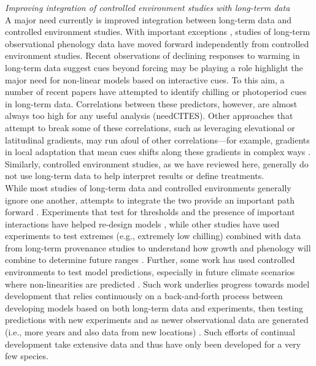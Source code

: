 \documentclass[11pt,letter]{article}
\begin{document}
\emph{Improving integration of controlled environment studies with long-term data}\\
A major need currently is improved integration between long-term data and controlled environment studies. With important exceptions \citep{gauzere2017}, studies of long-term observational phenology data have moved forward independently from controlled environment studies. Recent observations of declining responses to warming in long-term data suggest cues beyond forcing may be playing a role \citep{fu2015} highlight the major need for non-linear models based on interactive cues. To this aim, a number of recent papers have attempted to identify chilling or photoperiod cues in long-term data. Correlations between these predictors, however, are almost always too high for any useful analysis (needCITES). Other approaches that attempt to break some of these correlations, such as leveraging elevational or latitudinal gradients, may run afoul of other correlations---for example, gradients in local adaptation that mean cues shifts along these gradients in complex ways \citep{tansey2017}. Similarly, controlled environment studies, as we have reviewed here, generally do not use long-term data to help interpret results or define treatments. \\

While most studies of long-term data and controlled environments generally ignore one another, attempts to integrate the two provide an important path forward \citep{Caffarra:2011qf,nagano2012,satake2013,ford2016,chuinearees}. Experiments that test for thresholds and the presence of important interactions have helped re-design models \citep{Caffarra:2011qf,chuinearees}, while other studies have used experiments to test extremes (e.g., extremely low chilling) combined with data from long-term provenance studies to understand how growth and phenology will combine to determine future ranges \citep{ford2016}. Further, some work has used controlled environments to test model predictions, especially in future climate scenarios where non-linearities are predicted \citep[see][]{nagano2012}. Such work underlies progress towards model development that relies continuously on a back-and-forth process between developing models based on both long-term data and experiments, then testing predictions with new experiments and as newer observational data are generated (i.e., more years and also data from new locations) \citep{nagano2012,satake2013}. Such efforts of continual development take extensive data and thus have only been developed for a very few species.\\
\end{document}
